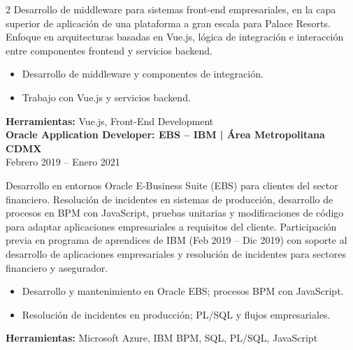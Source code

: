 \documentclass[11pt,a4paper]{article}
\begin{document}
\begin{paracol}{2}
Desarrollo de middleware para sistemas front-end empresariales, en la capa superior de aplicación de una plataforma a gran escala para Palace Resorts. Enfoque en arquitecturas basadas en Vue.js, lógica de integración e interacción entre componentes frontend y servicios backend.
\begin{itemize}[leftmargin=*, nosep, topsep=2pt]
  \item Desarrollo de middleware y componentes de integración.
  \item Trabajo con Vue.js y servicios backend.
\end{itemize}
\textbf{\textcolor{softtekOrange}{Herramientas:}} Vue.js, Front-End Development\\[0.8em]

\textcolor{softtekAccent}{\textbf{Oracle Application Developer: EBS -- IBM | Área Metropolitana CDMX}}\\
Febrero 2019 -- Enero 2021

Desarrollo en entornos Oracle E-Business Suite (EBS) para clientes del sector financiero. Resolución de incidentes en sistemas de producción, desarrollo de procesos en BPM con JavaScript, pruebas unitarias y modificaciones de código para adaptar aplicaciones empresariales a requisitos del cliente. Participación previa en programa de aprendices de IBM (Feb 2019 -- Dic 2019) con soporte al desarrollo de aplicaciones empresariales y resolución de incidentes para sectores financiero y asegurador.
\begin{itemize}[leftmargin=*, nosep, topsep=2pt]
  \item Desarrollo y mantenimiento en Oracle EBS; procesos BPM con JavaScript.
  \item Resolución de incidentes en producción; PL/SQL y flujos empresariales.
\end{itemize}
\textbf{\textcolor{softtekOrange}{Herramientas:}} Microsoft Azure, IBM BPM, SQL, PL/SQL, JavaScript
\end{paracol}
\end{document}
